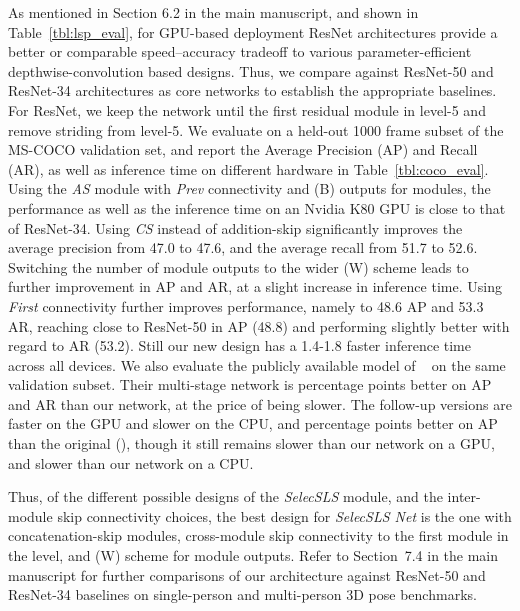 \documentclass[acmtog,authorversion]{acmart}
\begin{document}
As mentioned in Section 6.2 in the main manuscript, and shown in Table~\ref{tbl:lsp_eval}, for GPU-based deployment ResNet architectures provide a better or comparable speed--accuracy tradeoff to various parameter-efficient depthwise-convolution based designs.
Thus, we compare against ResNet-50 and ResNet-34 architectures as core networks to establish the appropriate baselines. For ResNet, we keep the network until the first residual module in level-5 and remove striding from level-5.
We evaluate on a held-out 1000 frame subset of the MS-COCO validation set, and report the Average Precision (AP) and Recall (AR), as well as inference time on different hardware in Table~\ref{tbl:coco_eval}. Using the \textit{AS} module with \textit{Prev} connectivity  
and (B) outputs for modules, the performance as well as the inference time on an Nvidia K80 GPU is close to that of ResNet-34. Using \textit{CS} instead of addition-skip significantly improves the average precision from 47.0 to 47.6, and the average recall from 51.7 to 52.6. Switching the number of module outputs to the wider (W) scheme leads to further improvement in AP and AR, at a slight increase in inference time. Using 
\textit{First} connectivity 
further improves performance, namely to 48.6 AP and 53.3 AR,
reaching close to ResNet-50 in AP (48.8) and performing slightly better with regard to AR (53.2).
Still our new design has a 1.4-1.8 faster inference time across all devices. 
We also evaluate the publicly available model of ~\cite{cao_affinity_2017} on the same validation subset. Their multi-stage network is  percentage points better on AP and AR than our network, at the price of being  slower. 
The follow-up versions \cite{cao2018openpose} are  faster on the GPU  and  slower on the CPU, and  percentage points better on AP than the original (\cite{cao_affinity_2017}), though it still remains  slower than our network on a GPU, and  slower than our network on a CPU.

Thus, of the different possible designs of the \textit{SelecSLS} module, and the inter-module skip connectivity choices, the best design for \textit{SelecSLS Net} is the one with concatenation-skip modules, cross-module skip connectivity to the first module in the level, and (W) scheme for module outputs. Refer to Section~7.4 in the main manuscript for further comparisons of our architecture against ResNet-50 and ResNet-34 baselines on single-person and multi-person 3D pose benchmarks.
\end{document}
